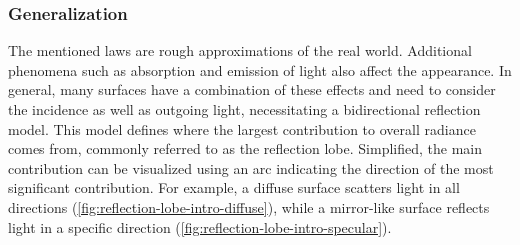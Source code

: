 \subsubsection{Generalization}
\label{sec:physics-generalization}

The mentioned laws are rough approximations of the real world. Additional phenomena such as absorption and emission of light also affect the appearance. In general, many surfaces have a combination of these effects and need to consider the incidence as well as outgoing light, necessitating a bidirectional reflection model. This model defines where the largest contribution to overall radiance comes from, commonly referred to as the reflection lobe. Simplified, the main contribution can be visualized using an arc indicating the direction of the most significant contribution.
 For example, a diffuse surface scatters light in all directions (\autoref{fig:reflection-lobe-intro-diffuse}), while a mirror-like surface reflects light in a specific direction (\autoref{fig:reflection-lobe-intro-specular}).

